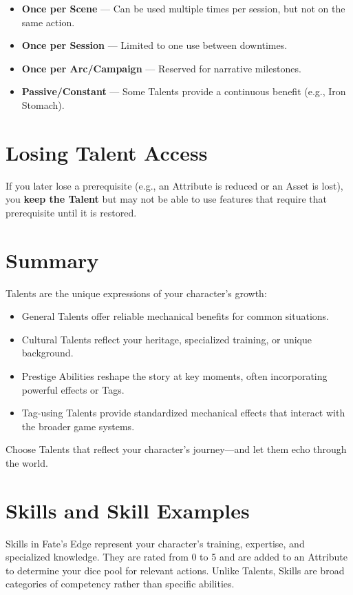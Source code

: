 \begin{itemize}
  \item \textbf{Once per Scene} — Can be used multiple times per session, but not on the same action.
  \item \textbf{Once per Session} — Limited to one use between downtimes.
  \item \textbf{Once per Arc/Campaign} — Reserved for narrative milestones.
  \item \textbf{Passive/Constant} — Some Talents provide a continuous benefit (e.g., Iron Stomach).
\end{itemize}

\section{Losing Talent Access}

If you later lose a prerequisite (e.g., an Attribute is reduced or an Asset is lost), you \textbf{keep the Talent} but may not be able to use features that require that prerequisite until it is restored.

\section{Summary}

Talents are the unique expressions of your character's growth:

\begin{itemize}
  \item General Talents offer reliable mechanical benefits for common situations.
  \item Cultural Talents reflect your heritage, specialized training, or unique background.
  \item Prestige Abilities reshape the story at key moments, often incorporating powerful effects or Tags.
  \item Tag-using Talents provide standardized mechanical effects that interact with the broader game systems.
\end{itemize}

Choose Talents that reflect your character's journey—and let them echo through the world.

\section{Skills and Skill Examples}

Skills in Fate's Edge represent your character's training, expertise, and specialized knowledge. They are rated from 0 to 5 and are added to an Attribute to determine your dice pool for relevant actions. Unlike Talents, Skills are broad categories of competency rather than specific abilities.

